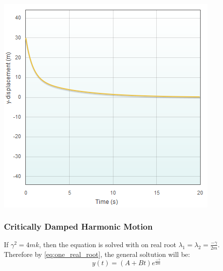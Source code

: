 \documentclass[11pt]{article} %
\newenvironment{Figure}
  {\par\medskip\noindent\minipage{\linewidth}}
  {\endminipage\par\medskip}
\begin{document}
\begin{multicols}{2}
\begin{Figure}
 \centering
 \includegraphics[width=\linewidth]{overdamped_free.png}
\end{Figure}


\subsubsection {Critically Damped Harmonic Motion}
If ${\gamma}^2 = 4mk$, then the equation is solved with on real root ${\lambda}_1 = {\lambda}_2 = \frac{-\gamma}{2m}$. Therefore by \eqref{eq:one_real_root}, the general soltution will be:
\begin{equation}
y(t) = (A + Bt)e^{{\frac{-\gamma}{2m}}}	
\end{equation}


\end{multicols}
\end{document}

